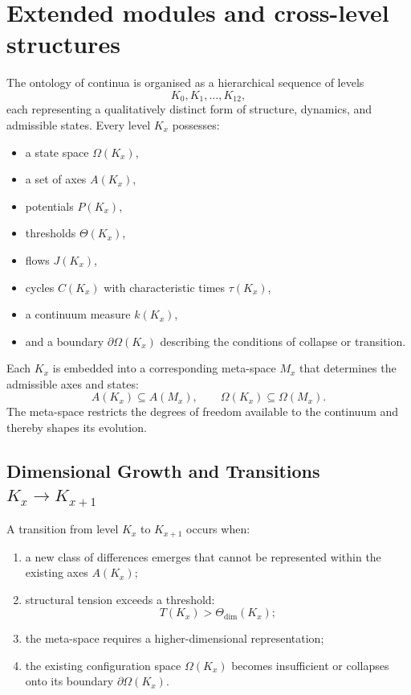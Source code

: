 
\section{Extended modules and cross-level structures}
\label{sec:klevels-master}

The ontology of continua is organised as a hierarchical sequence of
levels
\[
K_0, K_1, \dots, K_{12},
\]
each representing a qualitatively distinct form of structure,
dynamics, and admissible states.  
Every level $K_x$ possesses:
\begin{itemize}
    \item a state space $\Omega(K_x)$,
    \item a set of axes $A(K_x)$,
    \item potentials $P(K_x)$,
    \item thresholds $\Theta(K_x)$,
    \item flows $J(K_x)$,
    \item cycles $C(K_x)$ with characteristic times $\tau(K_x)$,
    \item a continuum measure $k(K_x)$,
    \item and a boundary $\partial\Omega(K_x)$ describing the conditions
          of collapse or transition.
\end{itemize}

Each $K_x$ is embedded into a corresponding meta-space $M_x$ that
determines the admissible axes and states:
\[
A(K_x) \subseteq A(M_x), \qquad 
\Omega(K_x) \subseteq \Omega(M_x).
\]
The meta-space restricts the degrees of freedom available to the
continuum and thereby shapes its evolution.


\subsection{Dimensional Growth and Transitions $K_x \to K_{x+1}$}

A transition from level $K_x$ to $K_{x+1}$ occurs when:
\begin{enumerate}
    \item a new class of differences emerges that cannot be represented
          within the existing axes $A(K_x)$;
    \item structural tension exceeds a threshold:
    \[
        T(K_x) > \Theta_{\mathrm{dim}}(K_x);
    \]
    \item the meta-space requires a higher-dimensional representation;
    \item the existing configuration space $\Omega(K_x)$ becomes
          insufficient or collapses onto its boundary $\partial\Omega(K_x)$.
\end{enumerate}

